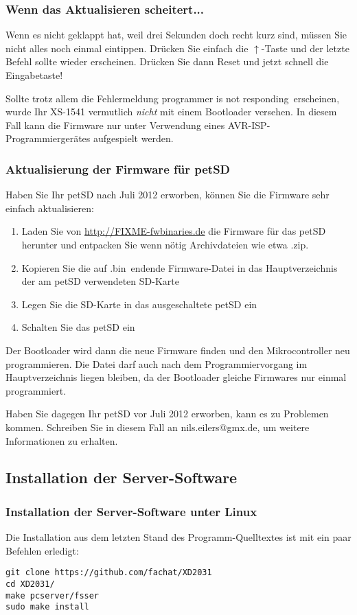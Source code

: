 \documentclass[10pt,a4paper]{scrartcl}		%
\newcommand{\fwbinaries}{http://FIXME-fwbinaries.de}
\begin{document}
\subsubsection*{Wenn das Aktualisieren scheitert...}
Wenn es nicht geklappt hat, weil drei Sekunden doch recht kurz sind,
müssen Sie nicht alles noch einmal eintippen. Drücken Sie einfach
die $\uparrow$-Taste und der letzte Befehl sollte
wieder erscheinen. Drücken Sie dann Reset und jetzt schnell die Eingabetaste!

Sollte trotz allem die Fehlermeldung \glqq programmer is not responding\grqq\ 
erscheinen, wurde Ihr XS-1541 vermutlich \textit{nicht} mit einem Bootloader
versehen. In diesem Fall kann die Firmware nur unter Verwendung eines
AVR-ISP-Programmiergerätes aufgespielt werden.

\subsubsection{Aktualisierung der Firmware für petSD}
\label{petsdfwinst}
Haben Sie Ihr petSD nach Juli 2012 erworben, können Sie die Firmware
sehr einfach aktualisieren:
\begin{enumerate}
\item Laden Sie von \url{\fwbinaries} die Firmware für das \mbox{petSD}
herunter und entpacken Sie wenn nötig Archivdateien wie etwa \glqq .zip\grqq . 
\item Kopieren Sie die auf \glqq .bin\grqq\ endende Firmware-Datei
in das Hauptverzeichnis der am petSD verwendeten SD-Karte
\item Legen Sie die SD-Karte in das ausgeschaltete petSD ein
\item Schalten Sie das petSD ein
\end{enumerate}
Der Bootloader wird dann die neue Firmware finden und den Mikrocontroller
neu programmieren. Die Datei darf auch nach dem Programmiervorgang im 
Hauptverzeichnis liegen bleiben, da der Bootloader gleiche Firmwares
nur einmal programmiert.

Haben Sie dagegen Ihr petSD vor Juli 2012 erworben, kann es zu
Problemen kommen. Schreiben Sie in diesem Fall an nils.eilers@gmx.de, 
um weitere Informationen zu erhalten.

\subsection{Installation der Server-Software}
\label{serverinst}
\subsubsection{Installation der Server-Software unter Linux}
Die Installation aus dem letzten Stand des Programm-Quelltextes
ist mit ein paar Befehlen erledigt:
\lstset{language=,}
\begin{lstlisting}
git clone https://github.com/fachat/XD2031
cd XD2031/
make pcserver/fsser
sudo make install
\end{lstlisting}
\end{document}
